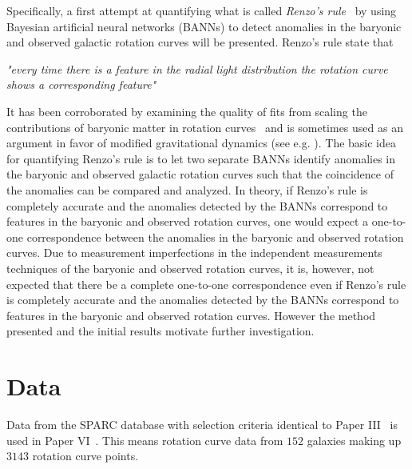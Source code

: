 \begin{example}

	 Specifically, a first attempt at quantifying what is called \emph{Renzo's rule}~\cite{Renzosrule} by using Bayesian artificial neural networks (BANNs) to detect anomalies in the baryonic and observed galactic rotation curves will be presented. Renzo's rule state that\newline
	
	\emph{"every time there is a feature in the radial light distribution the rotation curve shows a corresponding feature"}\newline
	
	It has been corroborated by examining the quality of fits from scaling the contributions of baryonic matter in rotation curves~\cite{Swaters2010,Swaters2012,Famaey2012} and is sometimes used as an argument in favor of modified gravitational dynamics (see e.g. \cite{Swaters2010,Famaey2012}).\newline 
	The basic idea for quantifying Renzo's rule is to let two separate BANNs identify anomalies in the baryonic and observed galactic rotation curves such that the coincidence of the anomalies can be compared and analyzed. In theory, if Renzo's rule is completely accurate and the anomalies detected by the BANNs correspond to features in the baryonic and observed rotation curves, one would expect a one-to-one correspondence between the anomalies in the baryonic and observed rotation curves. Due to measurement imperfections in the independent measurements techniques of the baryonic and observed rotation curves, it is, however, not expected that there be a complete one-to-one correspondence even if Renzo's rule is completely accurate and the anomalies detected by the BANNs correspond to features in the baryonic and observed rotation curves. However the method presented and the initial results motivate further investigation. 
	
	\section{Data}
	Data from the SPARC database with selection criteria identical to Paper III~\cite{Petersen:2017klw} is used in Paper VI~\cite{Petersen:2020renzo}. This means rotation curve data from $152$ galaxies making up $3143$ rotation curve points.
	

\end{example}
